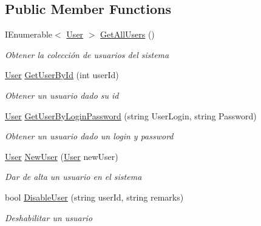 \subsection*{Public Member Functions}
\begin{DoxyCompactItemize}
\item 
I\+Enumerable$<$ \hyperlink{class_h_k_supply_1_1_models_1_1_user}{User} $>$ \hyperlink{class_h_k_supply_1_1_services_1_1_implementations_1_1_e_f_user_a145638eeeb9e29780d17cbac23476a8d}{Get\+All\+Users} ()
\begin{DoxyCompactList}\small\item\em Obtener la colección de usuarios del sistema \end{DoxyCompactList}\item 
\hyperlink{class_h_k_supply_1_1_models_1_1_user}{User} \hyperlink{class_h_k_supply_1_1_services_1_1_implementations_1_1_e_f_user_a322969baaacbf15223b17f8117dd1545}{Get\+User\+By\+Id} (int user\+Id)
\begin{DoxyCompactList}\small\item\em Obtener un usuario dado su id \end{DoxyCompactList}\item 
\hyperlink{class_h_k_supply_1_1_models_1_1_user}{User} \hyperlink{class_h_k_supply_1_1_services_1_1_implementations_1_1_e_f_user_a69f04e0ab5ba947fc315c60abc7cdbf1}{Get\+User\+By\+Login\+Password} (string User\+Login, string Password)
\begin{DoxyCompactList}\small\item\em Obtener un usuario dado un login y password \end{DoxyCompactList}\item 
\hyperlink{class_h_k_supply_1_1_models_1_1_user}{User} \hyperlink{class_h_k_supply_1_1_services_1_1_implementations_1_1_e_f_user_a12abd287dc0491eed772d88b17fc9618}{New\+User} (\hyperlink{class_h_k_supply_1_1_models_1_1_user}{User} new\+User)
\begin{DoxyCompactList}\small\item\em Dar de alta un usuario en el sistema \end{DoxyCompactList}\item 
bool \hyperlink{class_h_k_supply_1_1_services_1_1_implementations_1_1_e_f_user_acb2996bf9f333684786d3e2d7b702ba4}{Disable\+User} (string user\+Id, string remarks)
\begin{DoxyCompactList}\small\item\em Deshabilitar un usuario \end{DoxyCompactList}\item 

\end{DoxyCompactItemize}

